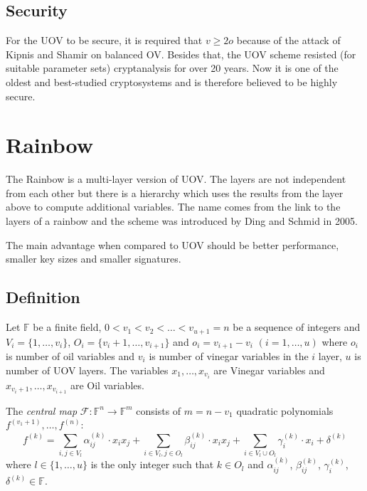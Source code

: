 \documentclass[thesis=M,english]{FITthesis}[2019/12/23]
\begin{document}
\subsection{Security}
For the UOV to be secure, it is required that $v \geq 2o$ because of the attack of Kipnis and Shamir on balanced OV.\cite{L-KS98} Besides that, the UOV scheme resisted (for suitable parameter sets) cryptanalysis for over 20 years. Now it is one of the oldest and best-studied cryptosystems and is therefore believed to be highly secure.

\newpage
\section{Rainbow}
The Rainbow is a multi-layer version of UOV. The layers are not independent from each other but there is a hierarchy which uses the results from the layer above to compute additional variables. The name comes from the link to the layers of a rainbow and the scheme was introduced by Ding and Schmid in 2005.

\bigskip
\noindent
The main advantage when compared to UOV should be better performance, smaller key sizes and smaller signatures.

\subsection{Definition}\label{rb-definition}
Let $\mathbb{F}$ be a finite field, $0<v_1<v_2<\ldots<v_{u+1} = n$ be a sequence of integers and $V_i=\{1, \ldots, v_i\}$, $O_i=\{v_i+1, \ldots, v_{i+1}\}$ and $o_i = v_{i+1} - v_i \,\, (i=1,\ldots,u)$ where $o_i$ is number of oil variables and $v_i$ is number of vinegar variables in the $i$ layer, $u$ is number of UOV layers. The variables $x_1, \ldots, x_{v_i}$ are Vinegar variables and $x_{v_{i}+1}, \ldots, x_{v_{i+1}}$ are Oil variables.

\bigskip
\noindent
The \textit{central map} $\mathcal{F}:\mathbb{F}^n \rightarrow \mathbb{F}^m$ consists of $m = n - v_1$ quadratic polynomials $f^{(v_1+1)}, \ldots, f^{(n)}$:
\[
f^{(k)} = \sum\limits_{i,j \in V_l}{\alpha_{ij}^{(k)} \cdot x_ix_j} + \sum\limits_{i \in V_l,j \in O_l}{\beta_{ij}^{(k)} \cdot x_ix_j}+ \sum\limits_{i \in V_l \cup O_l}{\gamma_{i}^{(k)} \cdot x_i} + \delta^{(k)}
\]
where $l \in \{1, \ldots, u\}$ is the only integer such that $k \in O_l$ and $\alpha_{ij}^{(k)}$, $\beta_{ij}^{(k)}$, $\gamma_{i}^{(k)}$, $\delta^{(k)} \in \mathbb{F}$.
\end{document}
